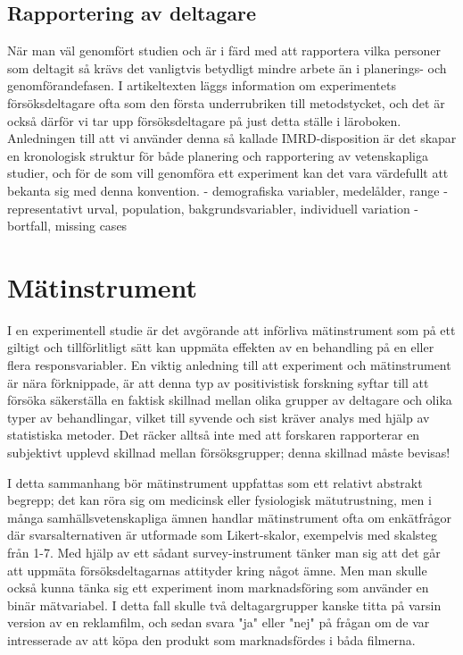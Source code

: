 \documentclass[
]{book}
\begin{document}
\hypertarget{sub07.2.6}{%
\subsection{Rapportering av deltagare}\label{sub07.2.6}}

När man väl genomfört studien och är i färd med att rapportera vilka personer som deltagit så krävs det vanligtvis betydligt mindre arbete än i planerings- och genomförandefasen. I artikeltexten läggs information om experimentets försöksdeltagare ofta som den första underrubriken till metodstycket, och det är också därför vi tar upp försöksdeltagare på just detta ställe i läroboken. Anledningen till att vi använder denna så kallade IMRD-disposition är det skapar en kronologisk struktur för både planering och rapportering av vetenskapliga studier, och för de som vill genomföra ett experiment kan det vara värdefullt att bekanta sig med denna konvention. - demografiska variabler, medelålder, range - representativt urval, population, bakgrundsvariabler, individuell variation - bortfall, missing cases

\hypertarget{sec07.3}{%
\section{Mätinstrument}\label{sec07.3}}

I en experimentell studie är det avgörande att införliva mätinstrument som på ett giltigt och tillförlitligt sätt kan uppmäta effekten av en behandling på en eller flera responsvariabler. En viktig anledning till att experiment och mätinstrument är nära förknippade, är att denna typ av positivistisk forskning syftar till att försöka säkerställa en faktisk skillnad mellan olika grupper av deltagare och olika typer av behandlingar, vilket till syvende och sist kräver analys med hjälp av statistiska metoder. Det räcker alltså inte med att forskaren rapporterar en subjektivt upplevd skillnad mellan försöksgrupper; denna skillnad måste bevisas!

I detta sammanhang bör mätinstrument uppfattas som ett relativt abstrakt begrepp; det kan röra sig om medicinsk eller fysiologisk mätutrustning, men i många samhällsvetenskapliga ämnen handlar mätinstrument ofta om enkätfrågor där svarsalternativen är utformade som Likert-skalor, exempelvis med skalsteg från 1-7. Med hjälp av ett sådant survey-instrument tänker man sig att det går att uppmäta försöksdeltagarnas attityder kring något ämne. Men man skulle också kunna tänka sig ett experiment inom marknadsföring som använder en binär mätvariabel. I detta fall skulle två deltagargrupper kanske titta på varsin version av en reklamfilm, och sedan svara "ja" eller "nej" på frågan om de var intresserade av att köpa den produkt som marknadsfördes i båda filmerna.
\end{document}
